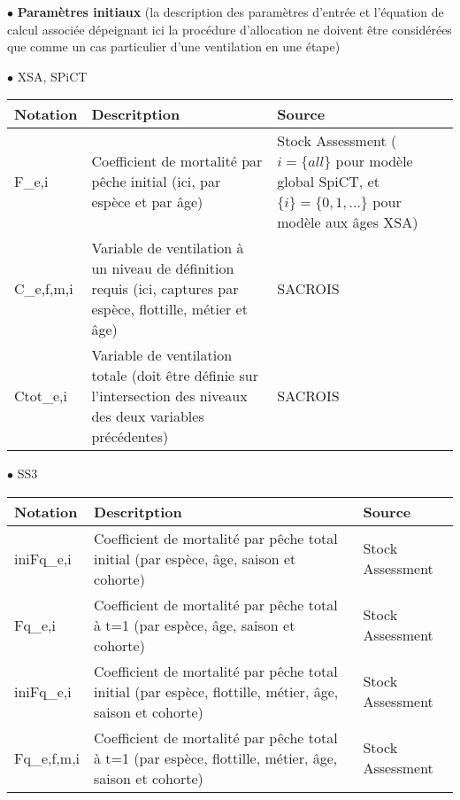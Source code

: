 \documentclass[12pt, colorinlistoftodos]{article}
\begin{document}
$\bullet$ \textbf{Paramètres initiaux} (la description des paramètres d'entrée et l'équation de calcul associée dépeignant 
ici la procédure d'allocation ne doivent être considérées que comme un cas particulier d'une ventilation en une étape) 
\fi 

\iffalse
\begin{table}[h]
\begin{center}

\begin{flushleft}
    $\bullet$ XSA, SPiCT
    \end{flushleft}
    \begin{tabularx}{\textwidth}{|L| X | X|}
    \hline
    \textbf{Notation} & \textbf{Descritption} & \textbf{Source} \\
     \hline
    F_{e,i} & Coefficient de mortalité par pêche initial (ici, par espèce et par âge) & 
    Stock Assessment ($i=\{all\}$ pour modèle global SpiCT, et $\{i\}=\{0,1,\ldots\}$ pour modèle aux âges XSA)\\ \hline
    C_{e,f,m,i} & Variable de ventilation à un niveau de définition requis (ici, captures par espèce, flottille, métier et âge) & 
    SACROIS\\ \hline
    Ctot_{e,i} & Variable de ventilation totale (doit être définie sur l’intersection des niveaux des deux variables précédentes) & 
    SACROIS\\
    \hline
    \end{tabularx}




    \begin{flushleft}
        $\bullet$ SS3
    \end{flushleft}
    \begin{tabularx}{\textwidth}{|L| X | X|}
        \hline
        \textbf{Notation} & \textbf{Descritption} & \textbf{Source} \\
         \hline
        iniFq_{e,i} & Coefficient de mortalité par pêche total initial (par espèce, âge, saison et cohorte) & Stock Assessment \\ \hline
        Fq_{e,i} & Coefficient de mortalité par pêche total à t=1 (par espèce, âge, saison et cohorte) & Stock Assessment \\ \hline
        iniFq_{e,i} & Coefficient de mortalité par pêche total initial (par espèce, flottille, métier, âge, saison et cohorte) & Stock Assessment \\ \hline
        Fq_{e,f,m,i} & Coefficient de mortalité par pêche total à t=1 (par espèce, flottille, métier, âge, saison et cohorte) & Stock Assessment \\ \hline


\end{tabularx}
\end{center}
\end{table}
\end{document}
